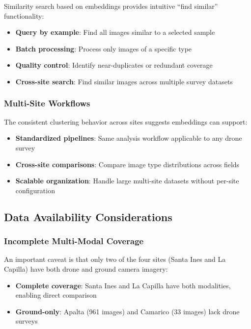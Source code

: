 Similarity search based on embeddings provides intuitive ``find similar'' functionality:

\begin{itemize}
    \item \textbf{Query by example}: Find all images similar to a selected sample
    \item \textbf{Batch processing}: Process only images of a specific type
    \item \textbf{Quality control}: Identify near-duplicates or redundant coverage
    \item \textbf{Cross-site search}: Find similar images across multiple survey datasets
\end{itemize}

\subsubsection{Multi-Site Workflows}

The consistent clustering behavior across sites suggests embeddings can support:
\begin{itemize}
    \item \textbf{Standardized pipelines}: Same analysis workflow applicable to any drone survey
    \item \textbf{Cross-site comparisons}: Compare image type distributions across fields
    \item \textbf{Scalable organization}: Handle large multi-site datasets without per-site configuration
\end{itemize}

\subsection{Data Availability Considerations}

\subsubsection{Incomplete Multi-Modal Coverage}

An important caveat is that only two of the four sites (Santa Ines and La Capilla) have both drone and ground camera imagery:

\begin{itemize}
    \item \textbf{Complete coverage}: Santa Ines and La Capilla have both modalities, enabling direct comparison
    \item \textbf{Ground-only}: Apalta (961 images) and Camarico (33 images) lack drone surveys
\end{itemize}

